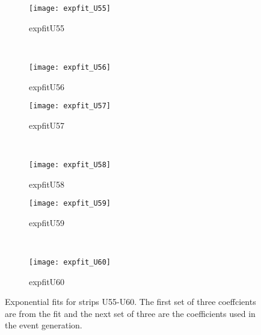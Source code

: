 \begin{figure}[h]
    \centering
    \begin{subfigure}[h]{0.44\textwidth}
        \centering
        \texttt{[image: expfit\_U55]}
        \caption{expfitU55}
        \label{fig:expfit_U55}
    \end{subfigure}
    ~
    \begin{subfigure}[h]{0.44\textwidth}
        \centering
        \texttt{[image: expfit\_U56]}
        \caption{expfitU56}
        \label{fig:expfit_U56}
    \end{subfigure}
    
    \begin{subfigure}[h]{0.44\textwidth}
        \centering
        \texttt{[image: expfit\_U57]}
        \caption{expfitU57}
        \label{fig:expfit_U57}
    \end{subfigure}
    ~
    \begin{subfigure}[h]{0.44\textwidth}
        \centering
        \texttt{[image: expfit\_U58]}
        \caption{expfitU58}
        \label{fig:expfit_U58}
    \end{subfigure}
    
    \begin{subfigure}[h]{0.44\textwidth}
        \centering
        \texttt{[image: expfit\_U59]}
        \caption{expfitU59}
        \label{fig:expfit_U59}
    \end{subfigure}
    ~
    \begin{subfigure}[h]{0.44\textwidth}
        \centering
        \texttt{[image: expfit\_U60]}
        \caption{expfitU60}
        \label{fig:expfit_U60}
    \end{subfigure}
    \caption{Exponential fits for strips U55-U60. The first set of three coeffcients are from the fit and the next set of three are
     the coefficients used in the event generation.}
    \label{fig:expfit2}
\end{figure}
\FloatBarrier

\FloatBarrier
